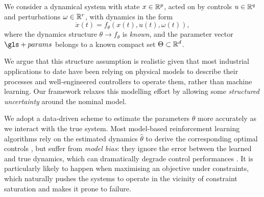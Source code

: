 \begin{assumption}
\begin{leftbar}[assumptionbar]
We consider a dynamical system with state $x\in\mathbb{R}^p$, acted on by controls $u\in\mathbb{R}^q$ and perturbations $\omega\in\mathbb{R}^r$, with dynamics in the form
\begin{equation*}
\dot{x}(t) = f_\theta\left(x(t),u(t),\omega(t)\right),
\end{equation*}
where the dynamics structure $\theta\rightarrow f_\theta$ is \emph{known}, and the parameter vector $\gls+{params}$ belongs to a known compact set $\Theta \subset \mathbb{R}^d$.
\end{leftbar}
\end{assumption}
\noindent We argue that this structure assumption is realistic given that most industrial applications to date have been relying on physical models to describe their processes and well-engineered controllers to operate them, rather than machine learning. Our framework relaxes this modelling effort by allowing some \emph{structured uncertainty} around the nominal model.

We adopt a data-driven scheme to estimate the parameters $\theta$ more accurately as we interact with the true system. Most model-based reinforcement learning algorithms rely on the estimated dynamics $\hat{\theta}$ to derive the corresponding optimal controls \citep[e.g.][]{Lenz2015,Levine2016}, but suffer from \emph{model bias}: they ignore the error between the learned and true dynamics, which can dramatically degrade control performances \citep{Doyle1978,Schneider1997}. It is particularly likely to happen when maximising an objective under constraints, which naturally pushes the systems to operate in the vicinity of constraint saturation and makes it prone to failure.


